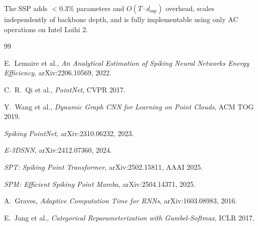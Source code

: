 \documentclass[11pt,a4paper]{article}
\begin{document}
The SSP adds $< 0.3\%$ parameters and $O(T\cdot d_{\text{ssp}})$ overhead,
scales independently of backbone depth, and is fully implementable using only AC
operations on Intel Loihi 2.

\begingroup
\small
\begin{thebibliography}{99}

E.~Lemaire et al., \textit{An Analytical Estimation of Spiking Neural Networks Energy Efficiency},
arXiv:2206.10569, 2022.

C.~R.~Qi et al., \textit{PointNet}, CVPR 2017.

Y.~Wang et al., \textit{Dynamic Graph CNN for Learning on Point Clouds}, ACM TOG 2019.

\textit{Spiking PointNet}, arXiv:2310.06232, 2023.

\textit{E-3DSNN}, arXiv:2412.07360, 2024.

\textit{SPT: Spiking Point Transformer}, arXiv:2502.15811, AAAI 2025.

\textit{SPM: Efficient Spiking Point Mamba}, arXiv:2504.14371, 2025.

A.~Graves, \textit{Adaptive Computation Time for RNNs}, arXiv:1603.08983, 2016.

E.~Jang et al., \textit{Categorical Reparameterization with Gumbel-Softmax}, ICLR 2017.

\end{thebibliography}
\endgroup
\end{document}
